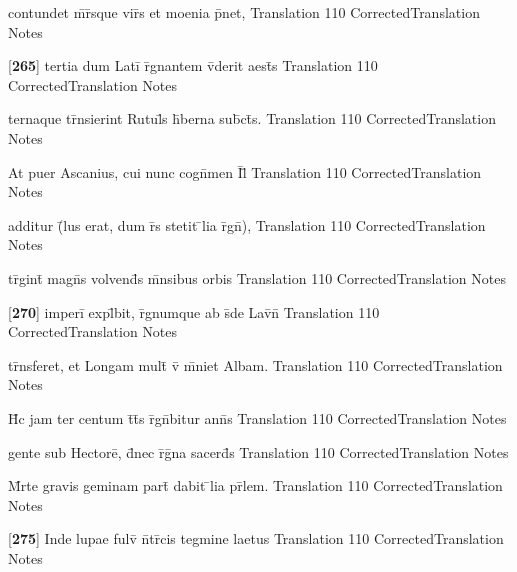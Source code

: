 \documentclass[]{book}
\begin{document}
\latline
  {contundet m\={}r\={}sque vir\={\macron {\i}}s et moenia p\={}net,}
  { Translation }
  {110}
  { CorrectedTranslation }
  { Notes }


\latline
  {[\textbf{265}] tertia dum Lati\={} r\={}gnantem v\={\macron {\i}}derit aest\={}s}
  { Translation }
  {110}
  { CorrectedTranslation }
  { Notes }


\latline
  {ternaque tr\={}nsierint Rutul\={\macron {\i}}s h\={\macron {\i}}berna sub\={}ct\={\macron {\i}}s.}
  { Translation }
  {110}
  { CorrectedTranslation }
  { Notes }


\latline
  {At puer Ascanius, cui nunc cogn\={}men I\={}l\={}}
  { Translation }
  {110}
  { CorrectedTranslation }
  { Notes }


\latline
  {additur (\={}lus erat, dum r\={}s stetit \={}lia r\={}gn\={}),}
  { Translation }
  {110}
  { CorrectedTranslation }
  { Notes }


\latline
  {tr\={\macron {\i}}gint\={} magn\={}s volvend\={\macron {\i}}s m\={}nsibus orbis}
  { Translation }
  {110}
  { CorrectedTranslation }
  { Notes }


\latline
  {[\textbf{270}] imperi\={} expl\={}bit, r\={}gnumque ab s\={}de Lav\={\macron {\i}}n\={\macron {\i}}}
  { Translation }
  {110}
  { CorrectedTranslation }
  { Notes }


\latline
  {tr\={}nsferet, et Longam mult\={} v\={\macron {\i}} m\={}niet Albam.}
  { Translation }
  {110}
  { CorrectedTranslation }
  { Notes }


\latline
  {H\={\macron {\i}}c jam ter centum t\={}t\={}s r\={}gn\={}bitur ann\={}s }
  { Translation }
  {110}
  { CorrectedTranslation }
  { Notes }


\latline
  {gente sub Hectore\={}, d\={}nec r\={}g\={\macron {\i}}na sacerd\={}s}
  { Translation }
  {110}
  { CorrectedTranslation }
  { Notes }


\latline
  {M\={}rte gravis geminam part\={} dabit \={}lia pr\={}lem.}
  { Translation }
  {110}
  { CorrectedTranslation }
  { Notes }


\latline
  {[\textbf{275}] Inde lupae fulv\={} n\={}tr\={\macron {\i}}cis tegmine laetus}
  { Translation }
  {110}
  { CorrectedTranslation }
  { Notes }
\end{document}
